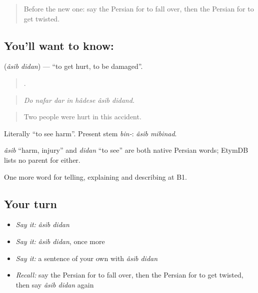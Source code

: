 \label{lesson:FA-C325-asib-didan}



\begin{quote}
Before the new one: say the Persian for to fall over, then the Persian for to get twisted.
\end{quote}

\subsection*{You'll want to know:  }
\textbf{ } (\emph{âsib didan}) — \textquotedblleft{}to get hurt, to be damaged\textquotedblright{}.

\begin{quote}
      .
\end{quote}

\begin{quote}
\emph{Do nafar dar in hâdese âsib didand.}
\end{quote}

\begin{quote}
Two people were hurt in this accident.
\end{quote}

Literally \textquotedblleft{}to see harm\textquotedblright{}. Present stem \emph{bin-}: \emph{âsib mibinad}.

\begin{cousinweb}
\emph{âsib} \textquotedblleft{}harm, injury\textquotedblright{} and \emph{didan} \textquotedblleft{}to see\textquotedblright{} are both native Persian words; EtymDB lists no parent for either.
\end{cousinweb}

\begin{grammarlens}[title={What you've built}]
One more word for telling, explaining and describing at B1.
\end{grammarlens}

\subsection*{Your turn}
\begin{itemize}
\raggedright
  \item \emph{Say it:} \emph{âsib didan}
  \item \emph{Say it:} \emph{âsib didan}, once more
  \item \emph{Say it:} a sentence of your own with \emph{âsib didan}
  \item \emph{Recall:} say the Persian for to fall over, then the Persian for to get twisted, then say \emph{âsib didan} again
\end{itemize}

